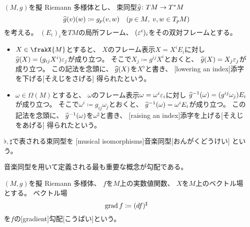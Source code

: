 \documentclass[report]{jlreq}
\begin{document}
\begin{definition}[音楽同型]
    $(M, g)$を擬 Riemann 多様体とし、
    束同型$\widehat{g} \colon TM \to T^*M$
    \begin{equation}
        \widehat{g}(v)(w) \coloneqq g_p(v, w)
            \quad
            (p \in M, \; v, w \in T_p M)
    \end{equation}
    を考える。
    $(E_i)_i$を$TM$の局所フレーム、
    $(\varepsilon^i)_i$をその双対フレームとする。
    \begin{itemize}
        \item $X \in \frakX{M}$とすると、
            $X$のフレーム表示$X = X^i E_i$に対し
            $\widehat{g}(X) = (g_{ij} X^i) \varepsilon_j$が成り立つ。
            そこで$X_j \coloneqq g^{ij} X^i$とおくと、
            $\widehat{g}(X) = X_j \varepsilon_j$が成り立つ。
            この記法を念頭に、
            $\widehat{g}(X)$を$X^\flat$と書き、
            [lowering an index]{添字を下げる}[そえじをさげる]
            得られたという。
        \item $\omega \in \Omega(M)$とすると、
            $\omega$のフレーム表示$\omega = \omega^i \varepsilon_i$に対し
            $\widehat{g}^{-1}(\omega) = (g^{ij} \omega_j) E_i$が成り立つ。
            そこで$\omega^i \coloneqq g_{ij} \omega_j$とおくと、
            $\widehat{g}^{-1}(\omega) = \omega^i E_i$が成り立つ。
            この記法を念頭に、
            $\widehat{g}^{-1}(\omega)$を$\omega^\sharp$と書き、
            [raising an index]{添字を上げる}[そえじをあげる]
            得られたという。
    \end{itemize}
    $\flat, \sharp$で表される束同型を
    [musical isomorphisms]{音楽同型}[おんがくどうけい]
    という。
\end{definition}

音楽同型を用いて定義される最も重要な概念が勾配である。

\begin{definition}[勾配]
    $(M, g)$を擬 Riemann 多様体、
    $f$を$M$上の{\smooth}実数値関数、
    $X$を$M$上のベクトル場とする。
    ベクトル場
    \begin{equation}
        \operatorname{grad} f \coloneqq (df)^\sharp
    \end{equation}
    を$f$の[gradient]{勾配}[こうばい]という。
\end{definition}
\end{document}
